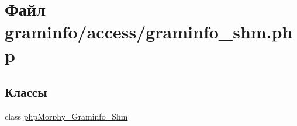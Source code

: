 \hypertarget{graminfo__shm_8php}{
\section{Файл graminfo/access/graminfo\_\-shm.php}
\label{graminfo__shm_8php}
}
\subsection*{Классы}
\begin{DoxyCompactItemize}
\item 
class \hyperlink{classphpMorphy__Graminfo__Shm}{phpMorphy\_\-Graminfo\_\-Shm}
\end{DoxyCompactItemize}
